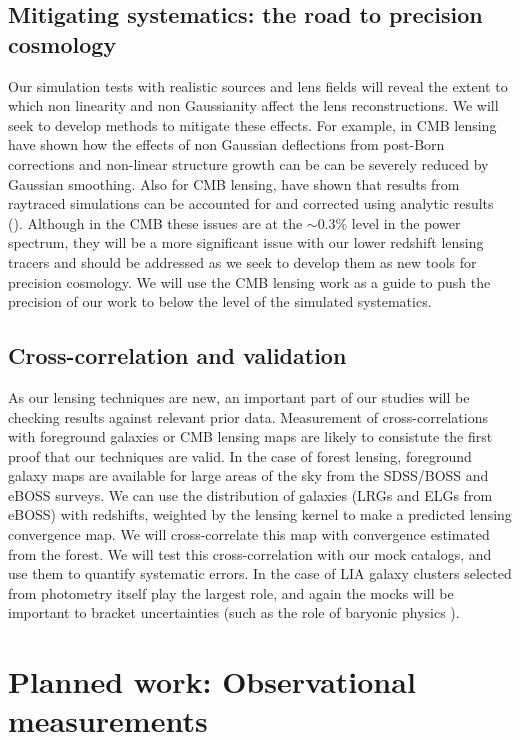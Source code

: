 \documentclass[12pt]{article}
\begin{document}
\begin{small}
\subsection{Mitigating systematics: the road to precision cosmology}

Our simulation tests with realistic sources and lens fields will reveal the extent to which non linearity and non Gaussianity
affect the lens reconstructions. We will seek to develop methods to mitigate these effects. For example, in CMB lensing \cite{lewis16} have shown how the effects of non Gaussian deflections from post-Born corrections and non-linear structure growth can be can be severely reduced by Gaussian smoothing. Also for CMB lensing, \cite{bohm18} have shown that results from raytraced simulations can be accounted for and corrected using  analytic results (\cite{bohm16}). Although in the CMB these issues are at the $\sim0.3 \%$ level in the power spectrum, they will be a more significant issue with our lower redshift lensing tracers and should be addressed as we seek to develop them as new tools for precision cosmology. We will use the CMB lensing work as a guide to push the precision of our work to below the level of the simulated systematics.

\subsection{Cross-correlation and validation}
As our lensing techniques are new, an important part of our studies will
be checking results against relevant prior data.
Measurement of cross-correlations with foreground galaxies or CMB
lensing maps are likely to consistute the first proof that our
techniques are valid.
 In the case of forest lensing,
foreground galaxy maps are available for large areas of the sky from the
SDSS/BOSS and eBOSS surveys. We can use the distribution of galaxies 
(LRGs and ELGs from eBOSS) with redshifts,
weighted by the lensing kernel to make a predicted lensing
convergence  map. We will
 cross-correlate this map with convergence estimated from the forest. 
We will test this cross-correlation with our mock catalogs, and use
them to quantify systematic errors. In the case of LIA galaxy
clusters selected from photometry itself play the largest role,
and again the mocks will be important to bracket uncertainties 
(such as the role of baryonic physics  \cite{zentner2013}).



\section{Planned work: Observational measurements}


\end{small}
\end{document}
